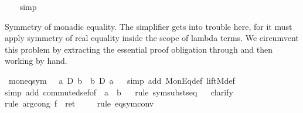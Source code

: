 \begin{isabellebody}
\ \ \isamarkupfalse%
\ simp\isamarkupfalse%
%
\begin{isamarkuptext}%
Symmetry of monadic equality. 
  The simplifier gets into trouble here, for it must apply symmetry
  of real equality inside the scope of lambda terms. We circumvent
  this problem by extracting the essential proof obligation through 
   and then working by hand.%
\end{isamarkuptext}%
\isamarkuptrue%
\ mon{\isacharunderscore}eq{\isacharunderscore}sym{\isacharcolon}\ \ \ {\isachardoublequote}{\isacharparenleft}a\ {\isacharequal}\isactrlsub D\ b{\isacharparenright}\ {\isacharequal}\ {\isacharparenleft}b\ {\isacharequal}\isactrlsub D\ a{\isacharparenright}{\isachardoublequote}\isanewline
\ \ \isamarkupfalse%
simp\ add{\isacharcolon}\ MonEq{\isacharunderscore}def\ liftM{}{\isacharunderscore}def{\isacharparenright}\isanewline
\ \ \isamarkupfalse%
simp\ add{\isacharcolon}\ commute{\isacharunderscore}dsef{\isacharbrackleft}of\ {\isachardoublequote}{\isasymDown}\ a{\isachardoublequote}\ {\isachardoublequote}{\isasymDown}\ b{\isachardoublequote}{\isacharbrackright}{\isacharparenright}\isanewline
\ \ \isamarkupfalse%
rule\ sym{\isacharunderscore}subst{\isacharunderscore}seq{}{\isacharparenright}\isanewline
\ \ \isamarkupfalse%
clarify{\isacharparenright}\isanewline
\ \ \isamarkupfalse%
rule\ arg{\isacharunderscore}cong{\isacharbrackleft}\ f\ {\isacharequal}\ ret{\isacharbrackright}{\isacharparenright}\ \isanewline
\ \ \isamarkupfalse%
\ {\isacharparenleft}rule\ eq{\isacharunderscore}sym{\isacharunderscore}conv{\isacharparenright}\isanewline
\isanewline
\isamarkupfalse%
\isanewline
\isamarkupfalse%
\end{isabellebody}%
